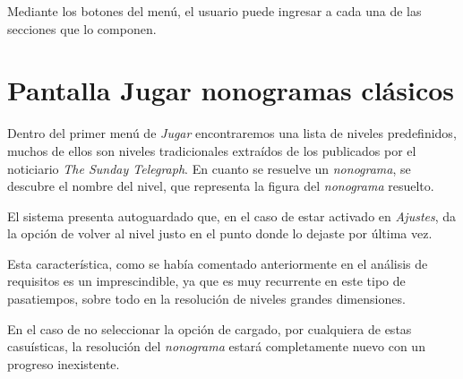Mediante los botones del menú, el usuario puede ingresar a cada una de las
secciones que lo componen.

\section{Pantalla Jugar nonogramas clásicos}
Dentro del primer menú de \textit{Jugar} encontraremos una lista de niveles
predefinidos, muchos de ellos son niveles tradicionales extraídos de los publicados por
el noticiario \textit{The Sunday Telegraph}.
En cuanto se resuelve un \textit{nonograma}, se descubre el nombre del
nivel, que representa la figura del \textit{nonograma} resuelto.

El sistema presenta autoguardado que, en el caso de estar activado en \textit{Ajustes},
da la opción de volver al nivel justo en el punto donde lo dejaste por última vez.

Esta característica, como se había comentado anteriormente en el análisis de requisitos es
un imprescindible, ya que es muy recurrente en este tipo de pasatiempos, sobre todo
en la resolución de niveles grandes dimensiones.

En el caso de no seleccionar la opción de cargado, por cualquiera de estas
casuísticas, la resolución del \textit{nonograma} estará completamente
nuevo con un progreso inexistente.

